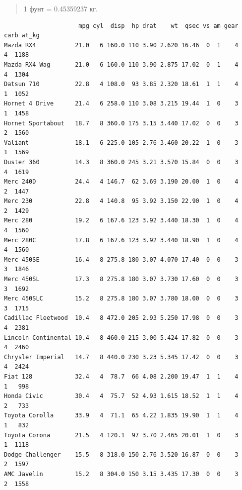 \documentclass[
]{book}
\newenvironment{Shaded}{\begin{snugshade}}{\end{snugshade}}
\newcommand{\DecValTok}[1]{\textcolor[rgb]{0.00,0.00,0.81}{#1}}
\newcommand{\FloatTok}[1]{\textcolor[rgb]{0.00,0.00,0.81}{#1}}
\newcommand{\KeywordTok}[1]{\textcolor[rgb]{0.13,0.29,0.53}{\textbf{#1}}}
\newcommand{\NormalTok}[1]{#1}
\newcommand{\OperatorTok}[1]{\textcolor[rgb]{0.81,0.36,0.00}{\textbf{#1}}}
\newcommand{\StringTok}[1]{\textcolor[rgb]{0.31,0.60,0.02}{#1}}
\begin{document}
\begin{quote}
1 фунт = 0.45359237 кг.
\end{quote}

\begin{Shaded}
\end{Shaded}

\begin{verbatim}
                     mpg cyl  disp  hp drat    wt  qsec vs am gear carb wt_kg
Mazda RX4           21.0   6 160.0 110 3.90 2.620 16.46  0  1    4    4  1188
Mazda RX4 Wag       21.0   6 160.0 110 3.90 2.875 17.02  0  1    4    4  1304
Datsun 710          22.8   4 108.0  93 3.85 2.320 18.61  1  1    4    1  1052
Hornet 4 Drive      21.4   6 258.0 110 3.08 3.215 19.44  1  0    3    1  1458
Hornet Sportabout   18.7   8 360.0 175 3.15 3.440 17.02  0  0    3    2  1560
Valiant             18.1   6 225.0 105 2.76 3.460 20.22  1  0    3    1  1569
Duster 360          14.3   8 360.0 245 3.21 3.570 15.84  0  0    3    4  1619
Merc 240D           24.4   4 146.7  62 3.69 3.190 20.00  1  0    4    2  1447
Merc 230            22.8   4 140.8  95 3.92 3.150 22.90  1  0    4    2  1429
Merc 280            19.2   6 167.6 123 3.92 3.440 18.30  1  0    4    4  1560
Merc 280C           17.8   6 167.6 123 3.92 3.440 18.90  1  0    4    4  1560
Merc 450SE          16.4   8 275.8 180 3.07 4.070 17.40  0  0    3    3  1846
Merc 450SL          17.3   8 275.8 180 3.07 3.730 17.60  0  0    3    3  1692
Merc 450SLC         15.2   8 275.8 180 3.07 3.780 18.00  0  0    3    3  1715
Cadillac Fleetwood  10.4   8 472.0 205 2.93 5.250 17.98  0  0    3    4  2381
Lincoln Continental 10.4   8 460.0 215 3.00 5.424 17.82  0  0    3    4  2460
Chrysler Imperial   14.7   8 440.0 230 3.23 5.345 17.42  0  0    3    4  2424
Fiat 128            32.4   4  78.7  66 4.08 2.200 19.47  1  1    4    1   998
Honda Civic         30.4   4  75.7  52 4.93 1.615 18.52  1  1    4    2   733
Toyota Corolla      33.9   4  71.1  65 4.22 1.835 19.90  1  1    4    1   832
Toyota Corona       21.5   4 120.1  97 3.70 2.465 20.01  1  0    3    1  1118
Dodge Challenger    15.5   8 318.0 150 2.76 3.520 16.87  0  0    3    2  1597
AMC Javelin         15.2   8 304.0 150 3.15 3.435 17.30  0  0    3    2  1558

\end{verbatim}
\end{document}
